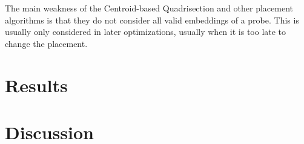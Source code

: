 \documentclass{llncs}
\newcommand{\ignore}[1]{}
\begin{document}
The main weakness of the Centroid-based Quadrisection and other placement algorithms is that
they do not consider all valid embeddings of a probe. This is usually only considered in later
optimizations, usually when it is too late to change the placement.

\section{Results}
\label{sec:results}

\ignore{Their results show that the running time of the Row-epitaxial algorithm
drops significantly with increasing recursion depth. The time required to place
the probes of a 500\,x\,500 chip, for instance, dropped by 69\% with $L = 3$ when
compared with the time required by the Row-epitaxial without any partitioning.

It is not clear from their experiments, however, how the choice of $L$ impaired
the performance of the Row-epitaxial algorithm in terms of solution quality since
they have restricted their experiments to $L \leq 3$. Moreover, there is no clear
trend toward reduction or increase in border length as $L$ varies from~0 to~3.}


\section{Discussion}
\label{sec:discuss}
\end{document}
